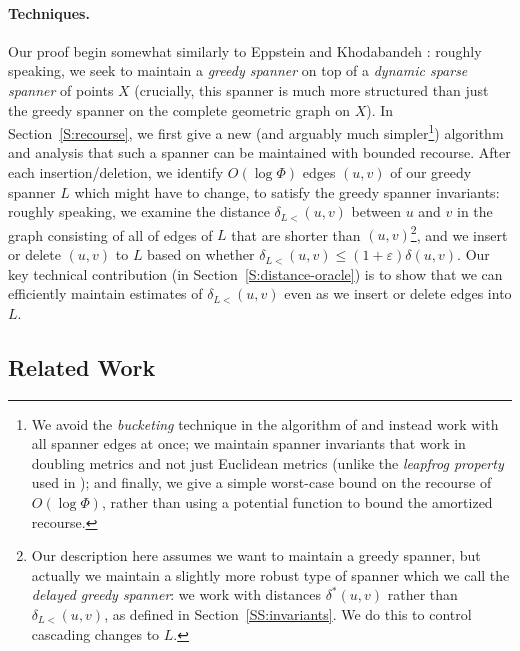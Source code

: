 \documentclass[11pt]{article}
\let\e\varepsilon               %
\newcommand{\dist}{\ensuremath{\delta}}
\begin{document}
\paragraph{Techniques.} Our proof begin somewhat similarly to Eppstein and Khodabandeh \cite{EK24}: roughly speaking, we seek to maintain a \emph{greedy spanner} on top of a \emph{dynamic sparse spanner} of points $X$ (crucially, this spanner is much more structured than just the greedy spanner on the complete geometric graph on $X$). In Section~\ref{S:recourse}, we first give a new (and arguably much simpler\footnote{We avoid the \emph{bucketing} technique in the algorithm of \cite{EK24} and instead work with all spanner edges at once; we maintain spanner invariants that work in doubling metrics and not just Euclidean metrics (unlike the \emph{leapfrog property} used in \cite{EK24}); and finally, we give a simple worst-case bound on the recourse of $O(\log \Phi)$, rather than using a potential function to bound the amortized recourse.}) algorithm and analysis that such a spanner can be maintained with bounded recourse.
After each insertion/deletion, we identify $O(\log \Phi)$ edges $(u,v)$ of our greedy spanner $L$ which might have to change, to satisfy the greedy spanner invariants: roughly speaking, we examine the distance $\dist_{L<}(u,v)$ between $u$ and $v$ in the graph consisting of all of edges of $L$ that are shorter than $(u,v)$\footnote{Our description here assumes we want to maintain a greedy spanner, but actually we maintain a slightly more robust type of spanner which we call the \emph{delayed greedy spanner}: we work with distances $\dist^*(u,v)$ rather than $\dist_{L<}(u,v)$, as defined in Section~\ref{SS:invariants}. We do this to control cascading changes to $L$.}, and we insert or delete $(u,v)$ to $L$ based on whether $\dist_{L<}(u,v) \le (1+\e) \dist(u,v)$. Our key technical contribution  (in Section~\ref{S:distance-oracle}) is to show that we can efficiently maintain estimates of $\dist_{L<}(u,v)$ even as we insert or delete edges into $L$.
%
%
%
\subsection{Related Work} 
\label{SS:related-work}
%
\end{document}
